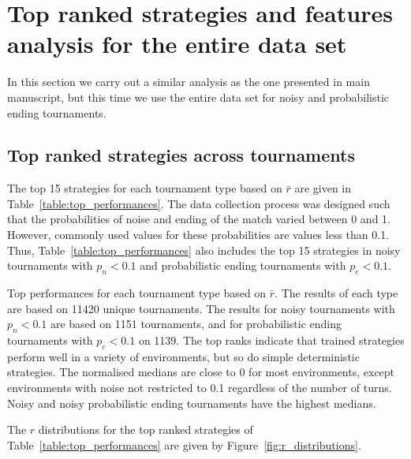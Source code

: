 \section{Top ranked strategies and features analysis for the entire data set}

In this section we carry out a similar analysis as the one presented in
main manuscript, but this time we use the entire data set for noisy and
probabilistic ending tournaments.

\subsection{Top ranked strategies across tournaments}

The top 15 strategies for each tournament type based on \(\bar{r}\) are given in
Table~\ref{table:top_performances}. The data collection process was designed
such that the probabilities of noise and ending of the match varied between 0
and 1. However, commonly used values for these probabilities are values less
than 0.1. Thus, Table~\ref{table:top_performances} also includes the top 15
strategies in noisy tournaments with \(p_n < 0.1\) and probabilistic ending
tournaments with \(p_e < 0.1\).

\begin{table}[!htbp]
    \begin{center}
    \resizebox{\textwidth}{!}{
        
    }
\end{center}
\caption{Top performances for each tournament type based on $\bar{r}$. The
results of each type are based on 11420 unique tournaments. The
results for noisy tournaments with \(p_n < 0.1\) are based on 1151 tournaments,
and for probabilistic ending tournaments with \(p_e < 0.1\) on 1139. The top
ranks indicate that trained strategies perform well in a variety of
environments, but so do simple deterministic strategies. The normalised medians
are close to 0 for most environments, except environments with noise not
restricted to 0.1 regardless of the number of turns. Noisy and noisy probabilistic
ending tournaments have the highest medians.}
\label{table:top_performances}
\end{table}

The \(r\) distributions for the top ranked strategies of Table~\ref{table:top_performances}
are given by Figure~\ref{fig:r_distributions}.

